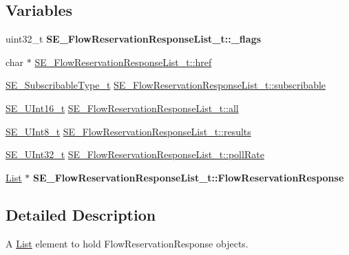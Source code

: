\subsection*{Variables}
\begin{DoxyCompactItemize}
\item 
\mbox{\label{group__FlowReservationResponseList_ga993fd3fa6aad53a3b52c902440a0db4a}} 
uint32\+\_\+t {\bfseries S\+E\+\_\+\+Flow\+Reservation\+Response\+List\+\_\+t\+::\+\_\+flags}
\item 
char $\ast$ \hyperlink{group__FlowReservationResponseList_ga15fbe7db82b92d888f7ac378b6ae49ac}{S\+E\+\_\+\+Flow\+Reservation\+Response\+List\+\_\+t\+::href}
\item 
\hyperlink{group__SubscribableType_ga5c41f553d369710ed34619266bf2551e}{S\+E\+\_\+\+Subscribable\+Type\+\_\+t} \hyperlink{group__FlowReservationResponseList_gade27c5a37e139e3291bdf606cf6d95e9}{S\+E\+\_\+\+Flow\+Reservation\+Response\+List\+\_\+t\+::subscribable}
\item 
\hyperlink{group__UInt16_gac68d541f189538bfd30cfaa712d20d29}{S\+E\+\_\+\+U\+Int16\+\_\+t} \hyperlink{group__FlowReservationResponseList_ga49a6d546054984cdaccef7c6ee2908f4}{S\+E\+\_\+\+Flow\+Reservation\+Response\+List\+\_\+t\+::all}
\item 
\hyperlink{group__UInt8_gaf7c365a1acfe204e3a67c16ed44572f5}{S\+E\+\_\+\+U\+Int8\+\_\+t} \hyperlink{group__FlowReservationResponseList_ga7869a4d9d09d798588eeaf961dc31a25}{S\+E\+\_\+\+Flow\+Reservation\+Response\+List\+\_\+t\+::results}
\item 
\hyperlink{group__UInt32_ga70bd4ecda3c0c85d20779d685a270cdb}{S\+E\+\_\+\+U\+Int32\+\_\+t} \hyperlink{group__FlowReservationResponseList_ga3d1bfff63a8e2e3b3a292796427ee70f}{S\+E\+\_\+\+Flow\+Reservation\+Response\+List\+\_\+t\+::poll\+Rate}
\item 
\mbox{\label{group__FlowReservationResponseList_ga7dae3ea66513445070d62a80fa1626b9}} 
\hyperlink{structList}{List} $\ast$ {\bfseries S\+E\+\_\+\+Flow\+Reservation\+Response\+List\+\_\+t\+::\+Flow\+Reservation\+Response}
\end{DoxyCompactItemize}


\subsection{Detailed Description}
A \hyperlink{structList}{List} element to hold Flow\+Reservation\+Response objects. 

